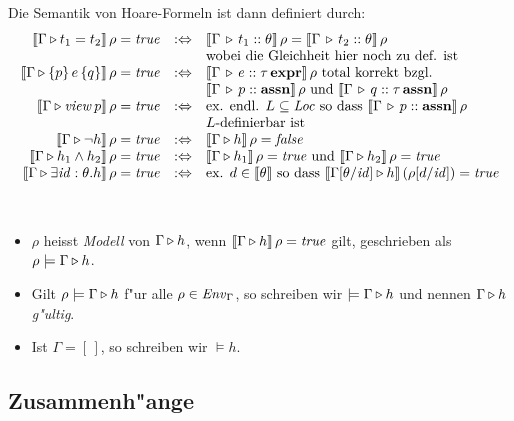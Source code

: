 \documentclass[12pt,a4paper,bigheadings]{scrartcl}
\newcommand{\semantic}[1]{\ensuremath{\llbracket#1\rrbracket}}
\newcommand{\assn}{\ensuremath{\mathbf{assn}}}
\newcommand{\atype}[1]{#1\,\assn}
\newcommand{\bexpr}{\ensuremath{\mathbf{expr}}}
\newcommand{\etype}[1]{#1\,\bexpr}
\newcommand{\view}[1]{\ensuremath{\app{\name{view}}{#1}}}
\begin{document}
\noindent
Die Semantik von Hoare-Formeln ist dann definiert durch:
\[\begin{array}{rcl}
  \semantic{\Tjh{\Gamma}{t_1 = t_2}}\,\rho = \true
  & :\Leftrightarrow &
  \semantic{\Tj{\Gamma}{t_1}{\theta}}\,\rho = \semantic{\Tj{\Gamma}{t_2}{\theta}}\,\rho \\
  && \text{wobei die Gleichheit hier noch zu def. ist}
  \\
  \semantic{\Tjh{\Gamma}{\triple{p}{e}{q}}}\,\rho = \true
  & :\Leftrightarrow &
  \semantic{\Tj{\Gamma}{e}{\etype{\tau}}}\,\rho \text{ total korrekt bzgl. } \\
  && \semantic{\Tj{\Gamma}{p}{\assn}}\,\rho \text{ und } \semantic{\Tj{\Gamma}{q}{\atype{\tau}}}\,\rho
  \\
  \semantic{\Tjh{\Gamma}{\view{p}}}\,\rho = \true
  & :\Leftrightarrow &
  \text{ex. endl. } L \subseteq \Loc \text{ so dass } \semantic{\Tj{\Gamma}{p}{\assn}}\,\rho \\
  && \text{$L$-definierbar ist}
  \\
  \semantic{\Tjh{\Gamma}{\neg h}}\,\rho = \true
  & :\Leftrightarrow &
  \semantic{\Tjh{\Gamma}{h}}\,\rho = \false
  \\
  \semantic{\Tjh{\Gamma}{h_1 \wedge h_2}}\,\rho = \true
  & :\Leftrightarrow &
  \semantic{\Tjh{\Gamma}{h_1}}\,\rho = \true \text{ und }
  \semantic{\Tjh{\Gamma}{h_2}}\,\rho = \true
  \\
  \semantic{\Tjh{\Gamma}{\exists \id:\theta.h}}\,\rho = \true
  & :\Leftrightarrow &
  \text{ex. } d \in \semantic{\theta} \text{ so dass }
  \semantic{\Tjh{\Gamma[\theta/\id]}{h}}\,(\rho[d/\id])=\true
\end{array}\]

\pagebreak[3]
\begin{definition}[Modell] \
  \begin{itemize}
    \item $\rho$ heisst {\em Modell} von $\Gamma \triangleright h$, wenn $\semantic{\Tjh{\Gamma}{h}}\,\rho = \true$
          gilt, geschrieben als $\rho \models \Gamma \triangleright h$.
    \item Gilt $\rho \models \Gamma \triangleright h$ f"ur alle $\rho\in{\text{\it Env\/}}_\Gamma$, so schreiben wir
          $\models \Gamma \triangleright h$ und nennen  $\Gamma \triangleright h$ {\em g"ultig}.
    \item Ist $\Gamma = [\,]$, so schreiben wir $\models h$.
  \end{itemize}
\end{definition}


\subsection{Zusammenh"ange}
\end{document}
